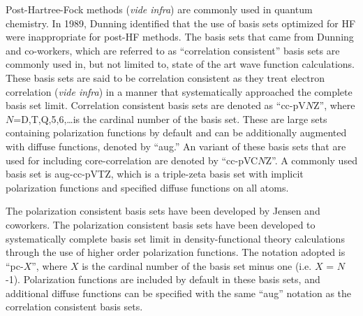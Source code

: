 \vspace{3mm}
\vspace{1mm}

Post-Hartree-Fock methods (\emph{vide infra}) are commonly used in quantum
chemistry. In 1989, Dunning\cite{Dunning1989, Kendall1992, Woon1994} identified
that the use of basis sets optimized for HF were inappropriate for post-HF
methods. The basis sets that came from Dunning and co-workers, which are
referred to as ``correlation consistent'' basis sets are commonly used in, but
not limited to, state of the art wave function calculations. These basis sets
are said to be correlation consistent as they treat electron correlation
(\emph{vide infra}) in a manner that systematically approached the complete
basis set limit. Correlation consistent basis sets are denoted as
``cc-pV$N$Z'', where $N$=D,T,Q,5,6,\ldots is the cardinal number of the basis
set. These are large sets containing polarization functions by default and can
be additionally augmented with diffuse functions, denoted by ``aug.'' An
variant of these basis sets that are used for including core-correlation are
denoted by ``cc-pVC$N$Z''.\cite{Peterson2002} A commonly used basis set is
aug-cc-pVTZ, which is a triple-zeta basis set with implicit polarization
functions and specified diffuse functions on all atoms.

\vspace{3mm}
\vspace{1mm}

The polarization consistent basis sets have been developed by Jensen and
coworkers.\cite{Jensen2001, Jensen2002, Jensen2002a, Jensen2003} The
polarization consistent basis sets have been developed to systematically
complete basis set limit in density-functional theory calculations through the
use of higher order polarization functions. The notation adopted is ``pc-$X$'',
where $X$ is the cardinal number of the basis set minus one (i.e. $X$ = $N$-1).
Polarization functions are included by default in these basis sets, and
additional diffuse functions can be specified with the same ``aug'' notation as
the correlation consistent basis sets.

\vspace{3mm}
\vspace{1mm}

